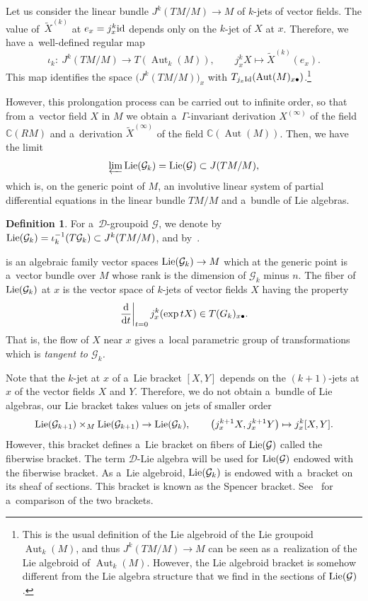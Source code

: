 \documentclass[pdftex]{sigma}
\numberwithin{equation}{section}
\theoremstyle{definition}
\newtheorem{Definition}[Theorem]{Definition}
\begin{document}
Let us consider the linear bundle $J^k(TM/M)\to M$ of $k$-jets of vector fields. The value of~$\widetilde X^{(k)}$ at $e_x = j^k_x{\rm id}$ depends only on the $k$-jet of $X$ at $x$. Therefore, we have a~well-defined regular map
\[\iota_k \colon\ J^{k}(TM/M) \to T(\operatorname{Aut}_k(M)), \qquad j^k_xX \mapsto \widetilde X^{(k)}(e_x).\]
This map identifies the space $\bigl(J^k(TM/M)\bigr)_x$ with $T_{j_x{\rm Id}}(\operatorname{Aut}(M)_{x\bullet})$.\footnote{This is the usual definition of the Lie algebroid of the Lie groupoid $\operatorname{Aut}_k(M)$, and thus $J^k(TM/M)\to M$ can be seen as a~realization of the Lie algebroid of $\operatorname{Aut}_k(M)$. However, the Lie algebroid bracket is somehow different from the Lie algebra structure that we find in the sections of ${\rm Lie}(\mathcal G)$.}

However, this prolongation process can be carried out to infinite order, so that from a~vector field $X$ in $M$ we obtain a~$\Gamma$-invariant derivation $X^{(\infty)}$ of the field $\mathbb C(RM)$ and a~derivation $\widetilde X^{(\infty)}$ of the field $\mathbb C(\operatorname{Aut}(M))$. Then, we have the limit
\[\varprojlim {\rm Lie}(\mathcal G_k) = {\rm Lie}(\mathcal G) \subset J(TM/M), \]
which is, on the generic point of $M$, an involutive linear system of partial differential equations in the linear bundle $TM/M$ and a~bundle of Lie algebras.

\begin{Definition}For a~$\mathcal D$-groupoid $\mathcal G$, we denote by
 ${\rm Lie}(\mathcal G_k) = \iota_k^{-1}(T\mathcal G_k) \subset J^{k}(TM/M)$, and by~.
\end{Definition}

 is an algebraic family vector spaces ${\rm Lie}(\mathcal G_k)\to M$ which at the generic point is a~vector bundle over $M$ whose rank is the dimension of $\mathcal G_k$ minus $n$. The fiber of ${\rm Lie}(\mathcal G_k)$ at $x$ is the vector space of $k$-jets of vector fields $X$ having the property
\[\left.\frac{{\rm d}}{{\rm d} t}\right\vert_{t=0} j_x^k(\exp tX) \in T\mathcal (G_k)_{x\bullet}.\]
That is, the flow of $X$ near $x$ gives a~local parametric group of transformations which is \emph{tangent to $\mathcal G_k$.}

Note that the $k$-jet at $x$ of a~Lie bracket $[X,Y]$ depends on the $(k+1)$-jets at $x$ of the vector fields $X$ and $Y$. Therefore, we do not obtain a~bundle of Lie algebras, our Lie bracket takes values on jets of smaller order
\[{\rm Lie}(\mathcal G_{k+1}) \times_M {\rm Lie}(\mathcal G_{k+1}) \to {\rm Lie}(\mathcal G_{k}),
 \qquad \bigl(j^{k+1}_x X, j^{k+1}_x Y\bigr) \mapsto j_x^k[X,Y].\]
However, this bracket defines a~Lie bracket on fibers of ${\rm Lie}(\mathcal G)$ called the fiberwise bracket.
The term $\mathcal D$-Lie algebra will be used for ${\rm Lie}(\mathcal G)$ endowed with the fiberwise bracket. As a~Lie algebroid, ${\rm Lie}(\mathcal G_k)$ is endowed with a~bracket on its sheaf of sections. This bracket is known as the Spencer bracket. See~\cite{malgrange2001groupoide} for a~comparison of the two brackets.
\end{document}
